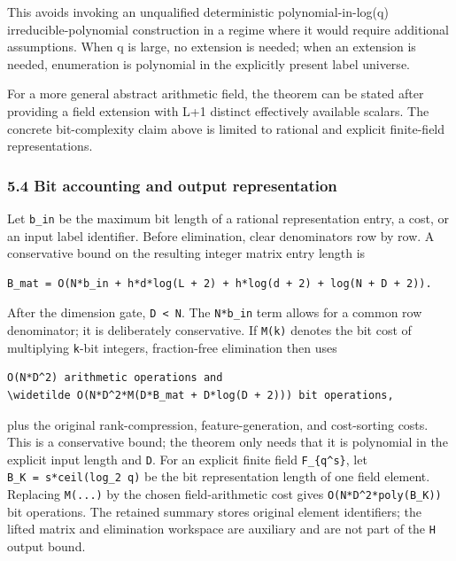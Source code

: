 This avoids invoking an unqualified deterministic polynomial-in-log(q) irreducible-polynomial construction in a regime where it would require additional assumptions. When q is large, no extension is needed; when an extension is needed, enumeration is polynomial in the explicitly present label universe.

For a more general abstract arithmetic field, the theorem can be stated after providing a field extension with L+1 distinct effectively available scalars. The concrete bit-complexity claim above is limited to rational and explicit finite-field representations.

\hypertarget{af-7a1626f5ae-bit-accounting-and-output-representation}{%
\subsubsection{5.4 Bit accounting and output representation}\label{af-7a1626f5ae-bit-accounting-and-output-representation}}

Let \texttt{b\_in} be the maximum bit length of a rational representation entry, a cost, or an input label identifier. Before elimination, clear denominators row by row. A conservative bound on the resulting integer matrix entry length is

\begin{verbatim}
B_mat = O(N*b_in + h*d*log(L + 2) + h*log(d + 2) + log(N + D + 2)).
\end{verbatim}

After the dimension gate, \texttt{D\ \textless{}\ N}. The \texttt{N*b\_in} term allows for a common row denominator; it is deliberately conservative. If \texttt{M(k)} denotes the bit cost of multiplying \texttt{k}-bit integers, fraction-free elimination then uses

\begin{verbatim}
O(N*D^2) arithmetic operations and
\widetilde O(N*D^2*M(D*B_mat + D*log(D + 2))) bit operations,
\end{verbatim}

plus the original rank-compression, feature-generation, and cost-sorting costs. This is a conservative bound; the theorem only needs that it is polynomial in the explicit input length and \texttt{D}. For an explicit finite field \texttt{F\_\{q\^{}s\}}, let \texttt{B\_K\ =\ s*ceil(log\_2\ q)} be the bit representation length of one field element. Replacing \texttt{M(...)} by the chosen field-arithmetic cost gives \texttt{O(N*D\^{}2*poly(B\_K))} bit operations. The retained summary stores original element identifiers; the lifted matrix and elimination workspace are auxiliary and are not part of the \texttt{\textbar{}H\textbar{}} output bound.

